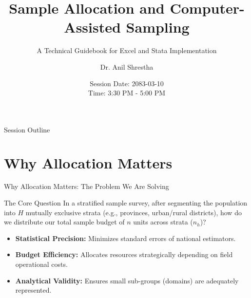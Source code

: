 \documentclass[10pt, aspectratio=169]{beamer}
\title[Sample Allocation Guidebook]{Sample Allocation and Computer-Assisted Sampling}
\subtitle{A Technical Guidebook for Excel and Stata Implementation}
\author[Dr. Anil Shrestha]{Dr. Anil Shrestha}
\institute[NSO]{National Statistical Training Reference Guide}
\date[Session Date: 2083-03-10]{Session Date: 2083-03-10 \\ \small Time: 3:30 PM - 5:00 PM}
\begin{document}
\begin{frame}[plain]
    \titlepage
\end{frame}

\begin{frame}{Session Outline}
    \tableofcontents
\end{frame}

\section{Why Allocation Matters}

\begin{frame}{Why Allocation Matters: The Problem We Are Solving}
    \begin{block}{The Core Question}
        In a stratified sample survey, after segmenting the population into $H$ mutually exclusive strata (e.g., provinces, urban/rural districts), how do we distribute our total sample budget of $n$ units across strata ($n_h$)?
    \end{block}
    \vspace{0.3cm}
    \begin{itemize}
        \item \textbf{Statistical Precision:} Minimizes standard errors of national estimators.
        \item \textbf{Budget Efficiency:} Allocates resources strategically depending on field operational costs.
        \item \textbf{Analytical Validity:} Ensures small sub-groups (domains) are adequately represented.
    \end{itemize}
\end{frame}
\end{document}
